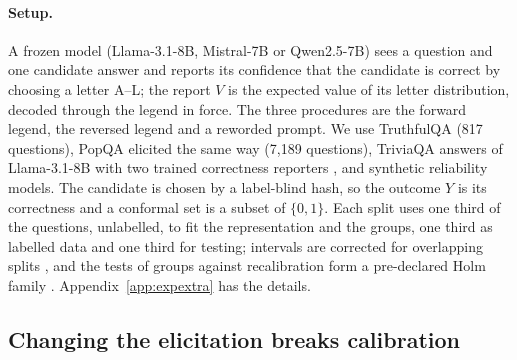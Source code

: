 \documentclass[11pt]{article}
\theoremstyle{definition}
\theoremstyle{remark}
\newcommand{\1}{\mathbf{1}}
\begin{document}
\paragraph{Setup.} A frozen model (Llama-3.1-8B, Mistral-7B or Qwen2.5-7B) sees a question and one candidate
answer and reports its confidence that the candidate is correct by choosing a letter A--L; the report $V$ is the
expected value of its letter distribution, decoded through the legend in force. The three procedures are the
forward legend, the reversed legend and a reworded prompt. We use TruthfulQA \citep{lin2022truthfulqa} (817
questions), PopQA \citep{mallen2023popqa} elicited the same way (7{,}189 questions), TriviaQA answers of
Llama-3.1-8B with two trained correctness reporters \citep{joshi2017triviaqa}, and synthetic reliability models.
The candidate is chosen by a label-blind hash, so the outcome $Y$ is its correctness and a conformal set is a
subset of $\{0,1\}$. Each split uses one third of the questions, unlabelled, to fit the representation and the
groups, one third as labelled data and one third for testing; intervals are corrected for overlapping splits
\citep{nadeau2003inference}, and the tests of groups against recalibration form a pre-declared Holm family
\citep{holm1979simple}. Appendix~\ref{app:expextra} has the details.

\subsection{Changing the elicitation breaks calibration}
\label{sec:exp-break}
\end{document}
